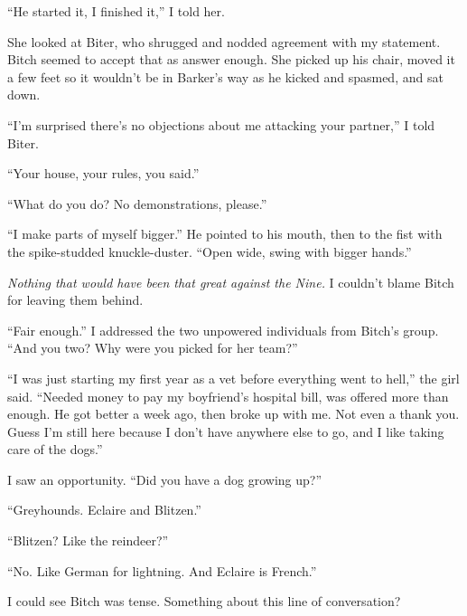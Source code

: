 ``He started it, I finished it,'' I told her.



She looked at Biter, who shrugged and nodded agreement with my statement.  Bitch seemed to accept that as answer enough.  She picked up his chair, moved it a few feet so it wouldn't be in Barker's way as he kicked and spasmed, and sat down.



``I'm surprised there's no objections about me attacking your partner,''  I told Biter.



``Your house, your rules, you said.''



``What do you do?  No demonstrations, please.''



``I make parts of myself bigger.''  He pointed to his mouth, then to the fist with the spike-studded knuckle-duster.  ``Open wide, swing with bigger hands.''



\emph{Nothing that would have been that great against the Nine.  }I couldn't blame Bitch for leaving them behind.



``Fair enough.''  I addressed the two unpowered individuals from Bitch's group.  ``And you two?  Why were you picked for her team?''



``I was just starting my first year as a vet before everything went to hell,'' the girl said.  ``Needed money to pay my boyfriend's hospital bill, was offered more than enough.  He got better a week ago, then broke up with me.  Not even a thank you.  Guess I'm still here because I don't have anywhere else to go, and I like taking care of the dogs.''



I saw an opportunity.  ``Did you have a dog growing up?''



``Greyhounds.  Eclaire and Blitzen.''



``Blitzen?  Like the reindeer?''



``No.  Like German for lightning.  And Eclaire is French.''



I could see Bitch was tense.  Something about this line of conversation?



